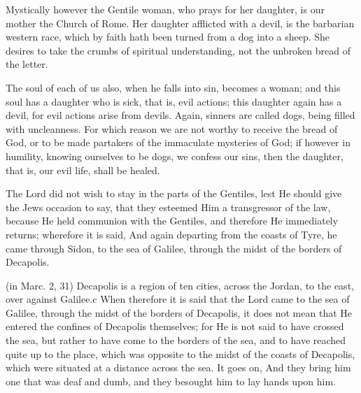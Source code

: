  Mystically however the Gentile woman, who prays for her daughter, is our mother the Church of Rome. Her daughter afflicted with a devil, is the barbarian western race, which by faith hath been turned from a dog into a sheep. She desires to take the crumbs of spiritual understanding, not the unbroken bread of the letter.

 The soul of each of us also, when he falls into sin, becomes a woman; and this soul has a daughter who is sick, that is, evil actions; this daughter again has a devil, for evil actions arise from devils. Again, sinners are called dogs, being filled with uncleanness. For which reason we are not worthy to receive the bread of God, or to be made partakers of the immaculate mysteries of God; if however in humility, knowing ourselves to be dogs, we confess our sins, then the daughter, that is, our evil life, shall be healed.

 

 The Lord did not wish to stay in the parts of the Gentiles, lest He should give the Jews occasion to say, that they esteemed Him a transgressor of the law, because He held communion with the Gentiles, and therefore He immediately returns; wherefore it is said, And again departing from the coasts of Tyre, he came through Sidon, to the sea of Galilee, through the midst of the borders of Decapolis.

 (in Marc. 2, 31) Decapolis is a region of ten cities, across the Jordan, to the east, over against Galilee.c When therefore it is said that the Lord came to the sea of Galilee, through the midst of the borders of Decapolis, it does not mean that He entered the confines of Decapolis themselves; for He is not said to have crossed the sea, but rather to have come to the borders of the sea, and to have reached quite up to the place, which was opposite to the midst of the coasts of Decapolis, which were situated at a distance across the sea. It goes on, And they bring him one that was deaf and dumb, and they besought him to lay hands upon him.

